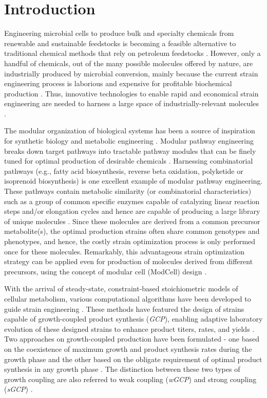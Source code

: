 \section{Introduction}

Engineering microbial cells to produce bulk and specialty chemicals from renewable and sustainable feedstocks is becoming a feasible alternative to traditional chemical methods that rely on petroleum feedstocks \citep{nielsen2016}.
However, only a handful of chemicals, out of the many possible molecules offered by nature, are industrially produced by microbial conversion, mainly because the current strain engineering process is laborious and expensive for profitable biochemical production \citep{trinh2016}.
Thus, innovative technologies to enable rapid and economical strain engineering are needed to harness a large space of industrially-relevant molecules \citep{connelly2015}.

The modular organization of biological systems has been a source of inspiration for synthetic biology and metabolic engineering \citep{purnick2009, sauro2008}.
Modular pathway engineering breaks down target pathways into tractable pathway modules that can be finely tuned for optimal production of desirable chemicals \citep{biggs2014, yadav2012}.
Harnessing combinatorial pathways (e.g., fatty acid biosynthesis, reverse beta oxidation, polyketide or isoprenoid biosynthesis) is one excellent example of modular pathway engineering.
These pathways contain metabolic similarity (or combinatorial characteristics) such as a group of common specific enzymes capable of catalyzing linear reaction steps \citep{rodriguez2014} and/or elongation cycles \citep{cheong2016, tseng2012, xu2013} and hence are capable of producing a large library of unique molecules \citep{ng2016}.
Since these molecules are derived from a common precursor metabolite(s), the optimal production strains often share common genotypes and phenotypes, and hence, the costly strain optimization process is only performed once for these molecules.
Remarkably, this advantageous strain optimization strategy can be applied even for production of molecules derived from different precursors, using the concept of modular cell (ModCell) design \citep{trinh2015, trinh2016, wilbanks2017}.

With the arrival of steady-state, constraint-based stoichiometric models of cellular metabolism, various computational algorithms have been developed to guide strain engineering \citep{chowdhury2015, long2015, yang2011}.
These methods have featured the design of strains capable of growth-coupled product synthesis (\emph{GCP}), enabling adaptive laboratory evolution of these designed strains to enhance product titers, rates, and yields \citep{fong2005, yadav2012, trinh2009, wilbanks2017}.
Two approaches on growth-coupled production have been formulated - one based on the coexistence of maximum growth and product synthesis rates during the growth phase \citep{burgard2003} and the other based on the obligate requirement of optimal product synthesis in any growth phase \citep{trinh2008}.
The distinction between these two types of growth coupling are also referred to weak coupling (\emph{wGCP}) and strong coupling (\emph{sGCP}) \citep{klamt2015, yang2011}.

